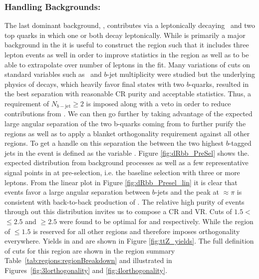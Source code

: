 \subsubsection{Handling Backgrounds: \ttZ}
\label{sec:crttz}
The last dominant background, \ttZ, contributes via a leptonically decaying \Zboson\ and two top quarks in which one or both decay leptonically.
While \ttZ is primarily a major background in \SRFR the it is useful to construct the region such that it includes three lepton events as well in order to improve statistics in the region as well as to be able to extrapolate over number of leptons in the fit.
Many variations of cuts on standard variables such as \met\ and $b$-jet multiplicity were studied but the underlying physics of \ttbar decays, which heavily favor final states with two $b$-quarks, resulted in the best separation with reasonable CR purity and acceptable statistics.
Thus, a requirement of $N_{b-\textrm{jet}}\geq2$ is imposed along with a \FourlTwoZ veto in order to reduce contributions from \ZZ.
We can then go further by taking advantage of the expected large angular separation of the two b-quarks coming from \ttbar to further purify the \ttZ regions as well as to apply a blanket orthogonality requirement against all other regions.
To get a handle on this separation the \dr between the two highest \pt $b$-tagged jets in the event is defined as the variable \dRbb.
Figure \ref{fig:dRbb_PreSel} shows the. expected distribution from background processes as well as a few representative signal points in \dRbb at pre-selection, i.e. the baseline selection with three or more leptons.
From the linear plot in Figure \ref{fig:dRbb_Presel_lin} it is clear that \ttZ events favor a large angular separation between $b$-jets and the peak at \dRbb $\approx \pi$ is consistent with back-to-back production of \ttbar.
The relative high purity of \ttZ events through out this distribution invites us to compose a CR and VR.
Cuts of $1.5<$\dRbb$\leq2.5$ and \dRbb$\geq2.5$ were found to be optimal for \VRttZ and \CRttZ respectively.
While the region of \dRbb$\leq1.5$ is reserved for all other regions and therefore imposes orthogonality everywhere.
Yields in \VRttZ and \CRttZ are shown in Figure \ref{fig:ttZ_yields}.
The full definition of cuts for this region are shown in the region summary Table~\ref{tab:regions:regionBreakdown} and illustrated in Figures~\ref{fig:3lorthogonality} and \ref{fig:4lorthogonality}.
